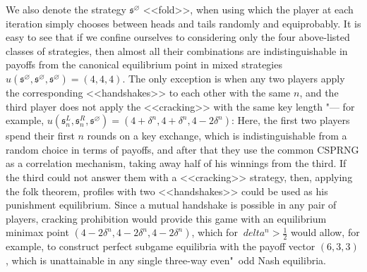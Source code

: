 We also denote the strategy $\mathfrak{s}^{\varnothing}$ <<fold>>, when using which the player at each iteration simply chooses between heads and tails randomly and equiprobably. It is easy to see that if we confine ourselves to considering only the four above-listed classes of strategies, then almost all their combinations are indistinguishable in payoffs from the canonical equilibrium point in mixed strategies $u(\mathfrak{s}^{\varnothing}, \mathfrak{s}^{\varnothing}, \mathfrak{s}^{\varnothing}) = (4, 4, 4)$. The only exception is when any two players apply the corresponding <<handshakes>> to each other with the same $n$, and the third player does not apply the <<cracking>> with the same key length "--- for example, $u(\mathfrak{s}^L_n, \mathfrak{s}^R_n, \mathfrak{s}^{\varnothing}) = (4 + \delta^n, 4 + \delta^n, 4 - 2 \delta^n)$: Here, the first two players spend their first $n$ rounds on a key exchange, which is indistinguishable from a random choice in terms of payoffs, and after that they use the common CSPRNG as a correlation mechanism, taking away half of his winnings from the third. If the third could not answer them with a <<cracking>> strategy, then, applying the folk theorem, profiles with two <<handshakes>> could be used as his punishment equilibrium. Since a mutual handshake is possible in any pair of players, cracking prohibition would provide this game with an equilibrium minimax point $(4 - 2 \delta^n, 4 - 2 \delta^n, 4 - 2 \delta^n)$, which for $\ delta^n > \frac{1}{2}$ would allow, for example, to construct perfect subgame equilibria with the payoff vector $(6, 3, 3)$, which is unattainable in any single three-way even"~odd Nash equilibria. %

